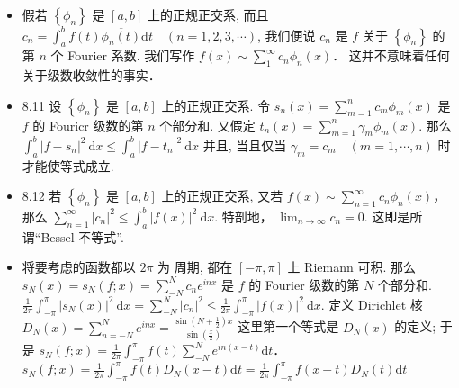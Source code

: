 \begin{itemize}
\item 假若 $\left\{\phi_{n}\right\}$ 是 $[a, b]$ 上的正规正交系, 而且 $c_{n}=\int_{a}^{b} f(t) \overline{\phi_{n}(t)} \mathrm{d} t \quad(n=1,2,3, \cdots)$, 我们便说 $c_{n}$ 是 $f$ 关于 $\left\{\phi_{n}\right\}$ 的第 $n$ 个 Fourier 系数. 我们写作 $f(x) \sim \sum_{1}^{\infty} c_{n} \phi_{n}(x)$． 这并不意味着任何关于级数收敛性的事实．

\item 8.11 设 $\left\{\phi_{n}\right\}$ 是 $[a, b]$ 上的正规正交系. 令 $s_{n}(x)=\sum_{m=1}^{n} c_{m} \phi_{m}(x)$ 是 $f$ 的 Fouricr 级数的第 $n$ 个部分和. 又假定 $t_{n}(x)=\sum_{m=1}^{n} \gamma_{m} \phi_{m}(x) .$ 那么 $\int_{a}^{b}\left|f-s_{n}\right|^{2} \mathrm{~d} x \leqslant \int_{a}^{b}\left|f-t_{n}\right|^{2} \mathrm{~d} x$ 并且, 当且仅当 $\gamma_{m}=c_{m} \quad(m=1, \cdots, n)$ 时才能使等式成立.

\item 8.12 若 $\left\{\phi_{n}\right\}$ 是 $[a, b]$ 上的正规正交系, 又若 $f(x) \sim \sum_{n=1}^{\infty} c_{n} \phi_{n}(x)$， 那么 $\sum_{n=1}^{\infty}\left|c_{n}\right|^{2} \leqslant \int_{a}^{b}|f(x)|^{2} \mathrm{~d} x$. 特剖地， $\lim _{n \rightarrow \infty} c_{n}=0$. 这即是所谓“Bessel 不等式”.

\item 将要考虑的函数都以 $2 \pi$ 为 周期, 都在 $[-\pi, \pi]$ 上 Riemann 可积. 那么 $s_{N}(x)=s_{N}(f ; x)=\sum_{-N}^{N} c_{n} e^{i n x}$ 是 $f$ 的 Fourier 级数的第 $N$ 个部分和. $\frac{1}{2 \pi} \int_{-\pi}^{\pi}\left|s_{N}(x)\right|^{2} \mathrm{~d} x=\sum_{-N}^{N}\left|c_{n}\right|^{2} \leqslant \frac{1}{2 \pi} \int_{-\pi}^{\pi}|f(x)|^{2} \mathrm{~d} x$. 定义 Dirichlet 核 $D_{N}(x)=\sum_{n=-N}^{N} e^{i n x}=\frac{\sin \left(N+\frac{1}{2}\right) x}{\sin \left(\frac{x}{2}\right)}$ 这里第一个等式是 $D_{N}(x)$ 的定义; 于是 $s_{N}(f ; x) =\frac{1}{2 \pi} \int_{-\pi}^{\pi} f(t) \sum_{-N}^{N} e^{i n(x-t)} \mathrm{d} t$． $s_{N}(f ; x)= \frac{1}{2 \pi} \int_{-\pi}^{\pi} f(t) D_{N}(x-t) \mathrm{d} t =\frac{1}{2 \pi} \int_{-\pi}^{\pi} f(x-t) D_{N}(t) \mathrm{d} t$
\end{itemize}

